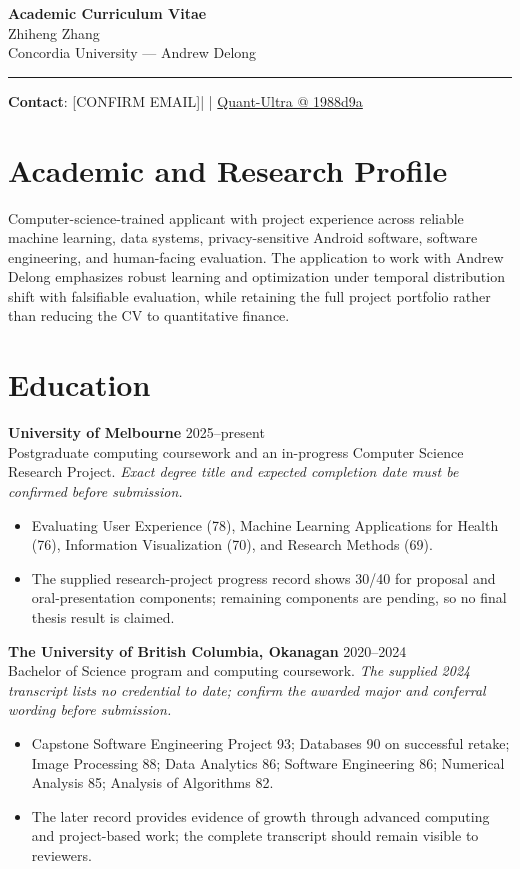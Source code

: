 \documentclass[11pt]{article}
\makeatletter
\newcommand{\ApplicantName}{Zhiheng Zhang}
\newcommand{\ApplicantEmail}{[CONFIRM EMAIL]}
\newcommand{\ApplicantPhone}{[CONFIRM PHONE]}
\newcommand{\ApplicantGitHub}{\href{https://github.com/zhiheng-zhang-Mera/Quant-Ultra/tree/1988d9a8530da91a8158de864d098ea869098923}{Quant-Ultra @ 1988d9a}}
\makeatother
\begin{document}
\begin{center}
{\LARGE\bfseries Academic Curriculum Vitae}\\[0.25em]
{\large \ApplicantName}\\
Concordia University --- Andrew Delong
\end{center}
\vspace{0.35em}\hrule\vspace{0.65em}

\textbf{Contact}: \ApplicantEmail\quad | \quad \ApplicantPhone\quad | \quad \ApplicantGitHub

\section*{Academic and Research Profile}
Computer-science-trained applicant with project experience across reliable machine learning, data systems, privacy-sensitive Android software, software engineering, and human-facing evaluation. The application to work with Andrew Delong emphasizes robust learning and optimization under temporal distribution shift with falsifiable evaluation, while retaining the full project portfolio rather than reducing the CV to quantitative finance.

\section*{Education}
\textbf{University of Melbourne} \hfill 2025--present\\
Postgraduate computing coursework and an in-progress Computer Science Research Project. \textit{Exact degree title and expected completion date must be confirmed before submission.}
\begin{itemize}
\item Evaluating User Experience (78), Machine Learning Applications for Health (76), Information Visualization (70), and Research Methods (69).
\item The supplied research-project progress record shows 30/40 for proposal and oral-presentation components; remaining components are pending, so no final thesis result is claimed.
\end{itemize}

\textbf{The University of British Columbia, Okanagan} \hfill 2020--2024\\
Bachelor of Science program and computing coursework. \textit{The supplied 2024 transcript lists no credential to date; confirm the awarded major and conferral wording before submission.}
\begin{itemize}
\item Capstone Software Engineering Project 93; Databases 90 on successful retake; Image Processing 88; Data Analytics 86; Software Engineering 86; Numerical Analysis 85; Analysis of Algorithms 82.
\item The later record provides evidence of growth through advanced computing and project-based work; the complete transcript should remain visible to reviewers.
\end{itemize}
\end{document}

